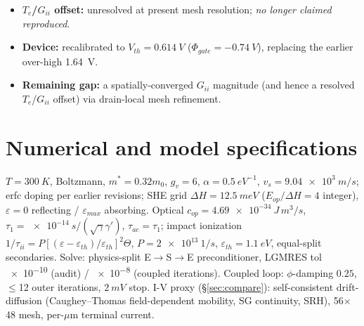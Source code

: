 \documentclass[11pt]{article}
\newcommand{\eps}{\varepsilon}
\begin{document}
\begin{itemize}[leftmargin=1.4em,itemsep=2pt]
(multiplicatively separable to $\sim$1\%). On the original device the coupled 60$\times$50 run
gives $5.24\times10^{26}\,\si{cm^{-3}s^{-1}}$, the \emph{finest-tested coupled value} (not a
continuum estimate: still $-38\%$ below coupled 40$\times$34, no plateau); a one-way energy
refinement moves it only $-2.4\%$. \emph{No converged magnitude can be quoted}
(Table~\ref{tab:giimat}).
\item \textbf{$T_e$/$G_{ii}$ offset:} unresolved at present mesh resolution; \emph{no longer
claimed reproduced}.
\item \textbf{Device:} recalibrated to $V_{th}=\SI{0.614}{V}$ ($\Phi_{gate}=\SI{-0.74}{V}$),
replacing the earlier over-high \SI{1.64}{V}.
\item \textbf{Remaining gap:} a spatially-converged $G_{ii}$ magnitude (and hence a resolved
$T_e$/$G_{ii}$ offset) via drain-local mesh refinement.
\end{itemize}

\appendix
\section{Numerical and model specifications}\label{sec:specs}
$T=\SI{300}{K}$, Boltzmann, $m^*=0.32m_0$, $g_v=6$, $\alpha=\SI{0.5}{eV^{-1}}$, $v_s=\SI{9.04e3}
{m/s}$; erfc doping per earlier revisions; SHE grid $\Delta H=\SI{12.5}{meV}$ ($E_{op}/\Delta H=4$
integer), $\eps=0$ reflecting / $\eps_{max}$ absorbing. Optical $c_{op}=\SI{4.69e-34}{J\,m^3/s}$,
$\tau_1=\SI{e-14}{s}/(\sqrt\gamma\gamma')$, $\tau_{ac}=\tau_1$; impact ionization
$1/\tau_{ii}=P[(\eps-\eps_{th})/\eps_{th}]^2\Theta$, $P=\SI{2e13}{1/s}$, $\eps_{th}=\SI{1.1}{eV}$,
equal-split secondaries. Solve: physics-split E$\to$S$\to$E preconditioner, LGMRES tol
\SI{e-10}{} (audit) / \SI{e-8}{} (coupled iterations). Coupled loop: $\phi$-damping $0.25$,
$\le$12 outer iterations, $\SI{2}{mV}$ stop. I-V proxy (\S\ref{sec:compare}): self-consistent
drift-diffusion (Caughey--Thomas field-dependent mobility, SG continuity, SRH), 56$\times$48 mesh,
per-$\mu$m terminal current.
\end{document}
